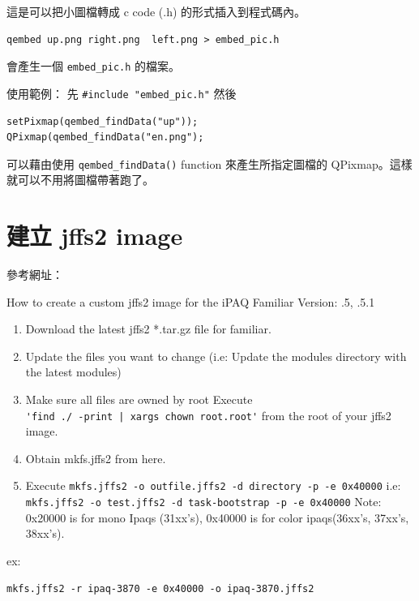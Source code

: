 \documentclass[12pt,a4paper]{article}
\begin{document}
\begin{CJK}{UTF8}{bsmi}
這是可以把小圖檔轉成 c code (.h) 的形式插入到程式碼內。

\begin{verbatim}
qembed up.png right.png  left.png > embed_pic.h
\end{verbatim}
會產生一個 \verb+embed_pic.h+ 的檔案。

使用範例：
先 \verb+#include "embed_pic.h"+
然後
\begin{verbatim}
setPixmap(qembed_findData("up"));
QPixmap(qembed_findData("en.png");
\end{verbatim}

可以藉由使用 \verb+qembed_findData()+ function 來產生所指定圖檔的 
QPixmap。這樣就可以不用將圖檔帶著跑了。

\section{建立 jffs2 image}
參考網址： \cite{make_jffs2}

How to create a custom jffs2 image for the iPAQ
Familiar Version: .5, .5.1
\begin{enumerate}
\item Download the latest jffs2 *.tar.gz file for familiar.
\item Update the files you want to change
  (i.e: Update the modules directory with the latest modules)
\item Make sure all files are owned by root Execute \\
\verb+'find ./ -print | xargs chown root.root'+ from the root of your jffs2 image.
\item Obtain mkfs.jffs2 from here.
\item Execute \verb+mkfs.jffs2 -o outfile.jffs2 -d directory -p -e 0x40000+
i.e: \verb+mkfs.jffs2 -o test.jffs2 -d task-bootstrap -p -e 0x40000+
Note: 0x20000 is for mono Ipaqs (31xx's), 0x40000 is for color ipaqs(36xx's, 37xx's, 38xx's).
\end{enumerate}

ex: 
\begin{verbatim}
mkfs.jffs2 -r ipaq-3870 -e 0x40000 -o ipaq-3870.jffs2
\end{verbatim}



\end{CJK}
\end{document}
